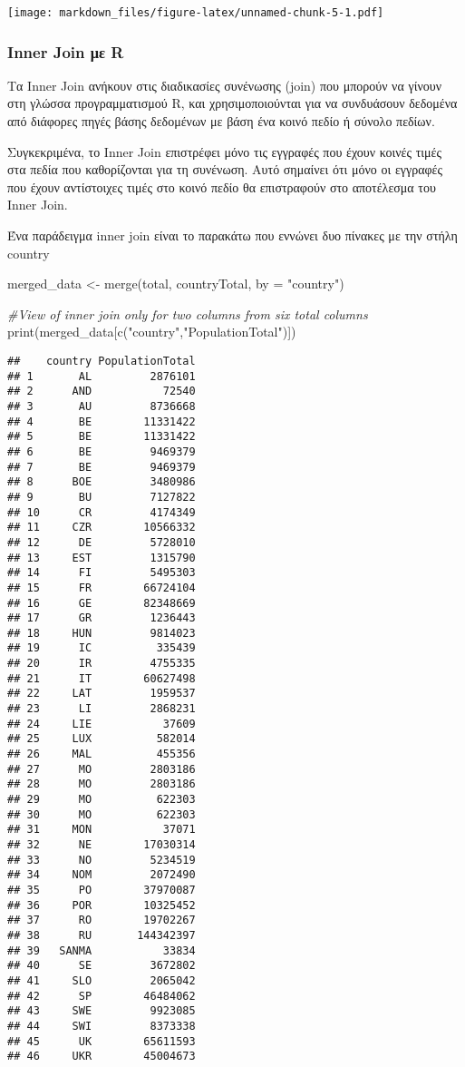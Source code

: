 \documentclass[
]{article}
\newenvironment{Shaded}{\begin{snugshade}}{\end{snugshade}}
\newcommand{\AttributeTok}[1]{\textcolor[rgb]{0.77,0.63,0.00}{#1}}
\newcommand{\CommentTok}[1]{\textcolor[rgb]{0.56,0.35,0.01}{\textit{#1}}}
\newcommand{\FunctionTok}[1]{\textcolor[rgb]{0.00,0.00,0.00}{#1}}
\newcommand{\NormalTok}[1]{#1}
\newcommand{\OtherTok}[1]{\textcolor[rgb]{0.56,0.35,0.01}{#1}}
\newcommand{\StringTok}[1]{\textcolor[rgb]{0.31,0.60,0.02}{#1}}
\begin{document}
\texttt{[image: markdown\_files/figure-latex/unnamed-chunk-5-1.pdf]}

\hypertarget{inner-join-ux3bcux3b5-r}{%
\subsubsection{Inner Join με R}\label{inner-join-ux3bcux3b5-r}}

Τα Inner Join ανήκουν στις διαδικασίες συνένωσης (join) που μπορούν να
γίνουν στη γλώσσα προγραμματισμού R, και χρησιμοποιούνται για να
συνδυάσουν δεδομένα από διάφορες πηγές βάσης δεδομένων με βάση ένα κοινό
πεδίο ή σύνολο πεδίων.

Συγκεκριμένα, το Inner Join επιστρέφει μόνο τις εγγραφές που έχουν
κοινές τιμές στα πεδία που καθορίζονται για τη συνένωση. Αυτό σημαίνει
ότι μόνο οι εγγραφές που έχουν αντίστοιχες τιμές στο κοινό πεδίο θα
επιστραφούν στο αποτέλεσμα του Inner Join.

Ένα παράδειγμα inner join είναι το παρακάτω που εννώνει δυο πίνακες με
την στήλη country

\begin{Shaded}
\begin{Highlighting}[]
\NormalTok{merged\_data }\OtherTok{\textless{}{-}} \FunctionTok{merge}\NormalTok{(total, countryTotal, }\AttributeTok{by =} \StringTok{"country"}\NormalTok{)}

\CommentTok{\#View of inner join only for two columns from six total columns}
\FunctionTok{print}\NormalTok{(merged\_data[}\FunctionTok{c}\NormalTok{(}\StringTok{"country"}\NormalTok{,}\StringTok{"PopulationTotal"}\NormalTok{)])}
\end{Highlighting}
\end{Shaded}

\begin{verbatim}
##    country PopulationTotal
## 1       AL         2876101
## 2      AND           72540
## 3       AU         8736668
## 4       BE        11331422
## 5       BE        11331422
## 6       BE         9469379
## 7       BE         9469379
## 8      BOE         3480986
## 9       BU         7127822
## 10      CR         4174349
## 11     CZR        10566332
## 12      DE         5728010
## 13     EST         1315790
## 14      FI         5495303
## 15      FR        66724104
## 16      GE        82348669
## 17      GR         1236443
## 18     HUN         9814023
## 19      IC          335439
## 20      IR         4755335
## 21      IT        60627498
## 22     LAT         1959537
## 23      LI         2868231
## 24     LIE           37609
## 25     LUX          582014
## 26     MAL          455356
## 27      MO         2803186
## 28      MO         2803186
## 29      MO          622303
## 30      MO          622303
## 31     MON           37071
## 32      NE        17030314
## 33      NO         5234519
## 34     NOM         2072490
## 35      PO        37970087
## 36     POR        10325452
## 37      RO        19702267
## 38      RU       144342397
## 39   SANMA           33834
## 40      SE         3672802
## 41     SLO         2065042
## 42      SP        46484062
## 43     SWE         9923085
## 44     SWI         8373338
## 45      UK        65611593
## 46     UKR        45004673
\end{verbatim}
\end{document}
